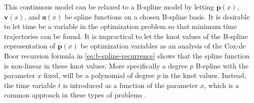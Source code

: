 This continuous model can be relaxed to a B-spline model by letting $\mathbf{p}(x)$, $\mathbf{v}(x)$, and $\mathbf{a}(x)$ be spline functions on a chosen B-spline basis. It is desirable to let time be a variable in the optimization problem so that minimum time trajectories can be found. It is impractical to let the knot values of the B-spline representation of $\mathbf{p}(x)$ be optimization variables as an analysis of the Cox-de Boor recursion formula in \cref{eq:b-spline-recurrence} shows that the spline function is non-linear in these knot values. More specifically a degree $p$ B-spline with the parameter $x$ fixed, will be a polynomial of degree $p$ in the knot values. Instead, the time variable $t$ is introduced as a function of the parameter $x$, which is a common approach in these types of problems \citep{mercy2017spline,ShortestPathsConvexSets}. 

